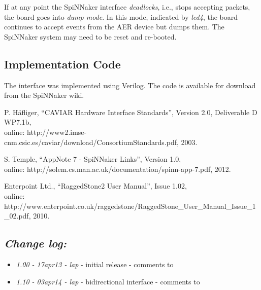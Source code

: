 If at any point the SpiNNaker interface \emph{deadlocks}, i.e., stops accepting packets, the board goes into \emph{dump mode}. In this mode, indicated by \emph{led4}, the board continues to accept events from the AER device but dumps them. The SpiNNaker system may need to be reset and re-booted.


\subsection{Implementation Code}


The interface was implemented using Verilog. The code is available for download from the SpiNNaker wiki.



\begin{thebibliography}{10}

P. H\"{a}fliger, ``CAVIAR Hardware Interface Standards'', Version 2.0, Deliverable D WP7.1b,
\\online: http://www2.imse-cnm.csic.es/caviar/download/ConsortiumStandards.pdf, 2003.

S. Temple, ``AppNote 7 - SpiNNaker Links'', Version 1.0,
\\online: http://solem.cs.man.ac.uk/documentation/spinn-app-7.pdf, 2012.

Enterpoint Ltd., ``RaggedStone2 User Manual'', Issue 1.02,
\\online: http://www.enterpoint.co.uk/raggedstone/RaggedStone\_User\_Manual\_Issue\_1\_02.pdf, 2010.

\end{thebibliography}


\subsection{\itshape Change log:}

\begin{itemize}
\item {\itshape 1.00 - 17apr13 - lap} - initial release - comments to
  {\itshape \Email}
\item {\itshape 1.10 - 03apr14 - lap} - bidirectional interface - comments to
  {\itshape \Email}
\end{itemize}


